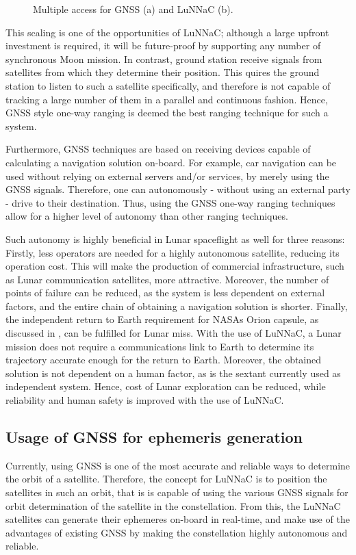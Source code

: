 \begin{figure}
\label{fig:multiaccess}
\caption{Multiple access for GNSS (a) and LuNNaC (b).}
\end{figure}

This scaling is one of the opportunities of LuNNaC; although a large upfront investment is required, it will be future-proof by supporting any number of synchronous Moon mission.
In contrast, ground station receive signals from satellites from which they determine their position.
This quires the ground station to listen to such a satellite specifically, and therefore is not capable of tracking a large number of them in a parallel and continuous fashion.
Hence, GNSS style one-way ranging is deemed the best ranging technique for such a system.

Furthermore, GNSS techniques are based on receiving devices capable of calculating a navigation solution on-board. 
For example, car navigation can be used without relying on external servers and/or services, by merely using the GNSS signals. 
Therefore, one can autonomously - without using an external party - drive to their destination.
Thus, using the GNSS one-way ranging techniques allow for a higher level of autonomy than other ranging techniques.

Such autonomy is highly beneficial in Lunar spaceflight as well for three reasons:
Firstly, less operators are needed for a highly autonomous satellite, reducing its operation cost. This will make the production of commercial infrastructure, such as Lunar communication satellites, more attractive.
Moreover, the number of points of failure can be reduced, as the system is less dependent on external factors, and the entire chain of obtaining a navigation solution is shorter. 
Finally, the independent return to Earth requirement for NASAs Orion capsule, as discussed in \cite{}, can be fulfilled for Lunar miss.
With the use of LuNNaC, a Lunar mission does not require a communications link to Earth to determine its trajectory accurate enough for the return to Earth.
Moreover, the obtained solution is not dependent on a human factor, as is the sextant currently used as independent system.
Hence, cost of Lunar exploration can be reduced, while reliability and human safety is improved with the use of LuNNaC.


\subsection{Usage of GNSS for ephemeris generation}
Currently, using GNSS is one of the most accurate and reliable ways to determine the orbit of a satellite.
Therefore, the concept for LuNNaC is to position the satellites in such an orbit, that is is capable of using the various GNSS signals for orbit determination of the satellite in the constellation.
From this, the LuNNaC satellites can generate their ephemeres on-board in real-time, and make use of the advantages of existing GNSS by making the constellation highly autonomous and reliable.


